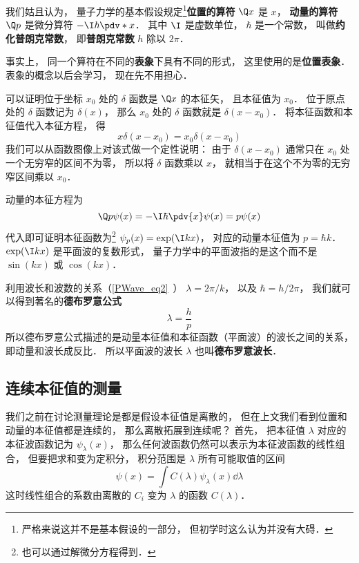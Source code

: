 我们姑且认为， 量子力学的基本假设规定\footnote{严格来说这并不是基本假设的一部分， 但初学时这么认为并没有大碍．}\textbf{位置的算符} $\Q x$ 是 $x$， \textbf{动量的算符} $\Q p$ 是微分算符 $-\I\hbar \pdv*{x}$． 其中 $\I$ 是虚数单位， $\hbar$ 是一个常数， 叫做\textbf{约化普朗克常数}， 即\textbf{普朗克常数} $h$ 除以 $2\pi$．

事实上， 同一个算符在不同的\textbf{表象}下具有不同的形式， 这里使用的是\textbf{位置表象}． 表象的概念以后会学习， 现在先不用担心．

可以证明位于坐标 $x_0$ 处的 $\delta$ 函数是 $\Q x$ 的本征矢， 且本征值为 $x_0$． 位于原点处的 $\delta$ 函数记为 $\delta(x)$， 那么 $x_0$ 处的 $\delta$ 函数就是 $\delta (x - x_0)$． 将本征函数和本征值代入本征方程， 得
\begin{equation}
x \delta(x - x_0) = x_0 \delta(x - x_0)
\end{equation}
我们可以从函数图像上对该式做一个定性说明： 由于 $\delta(x - x_0)$ 通常只在 $x_0$ 处一个无穷窄的区间不为零， 所以将 $\delta$ 函数乘以 $x$， 就相当于在这个不为零的无穷窄区间乘以 $x_0$．

动量的本征方程为
\begin{equation}
\Q p \psi(x) = -\I\hbar \pdv{x} \psi(x) = p \psi(x)
\end{equation}
代入即可证明本征函数为\footnote{也可以通过解微分方程得到．} $\psi_p(x) = \exp(\I k x)$， 对应的动量本征值为 $p = \hbar k$． $\exp(\I k x)$ 是平面波的复数形式， 量子力学中的平面波指的是这个而不是 $\sin(kx)$ 或 $\cos(kx)$．

利用波长和波数的关系（\autoref{PWave_eq2}~）
$\lambda = 2\pi/k$， 以及 $\hbar = h/2\pi$， 我们就可以得到著名的\textbf{德布罗意公式}
\begin{equation}
\lambda = \frac{h}{p}
\end{equation}
所以德布罗意公式描述的是动量本征值和本征函数（平面波）的波长之间的关系， 即动量和波长成反比． 所以平面波的波长 $\lambda$ 也叫\textbf{德布罗意波长}．

\subsection{连续本征值的测量}
我们之前在讨论测量理论是都是假设本征值是离散的， 但在上文我们看到位置和动量的本征值都是连续的， 那么离散拓展到连续呢？ 首先， 把本征值 $\lambda$ 对应的本征波函数记为 $\psi_\lambda(x)$， 那么任何波函数仍然可以表示为本征波函数的线性组合， 但要把求和变为定积分， 积分范围是 $\lambda$ 所有可能取值的区间
\begin{equation}
\psi(x) = \int C(\lambda)\psi_\lambda(x) \dd{\lambda}
\end{equation}
这时线性组合的系数由离散的 $C_i$ 变为 $\lambda$ 的函数 $C(\lambda)$．

